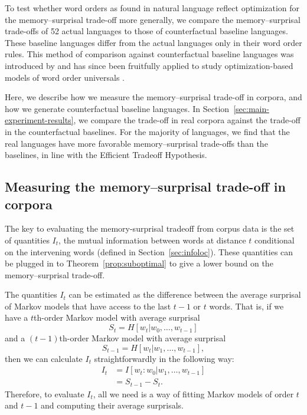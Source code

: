 To test whether word orders as found in natural language reflect optimization for the memory--surprisal trade-off more generally, we compare the memory--surprisal trade-offs of 52 actual languages to those of counterfactual baseline languages. These baseline languages differ from the actual languages only in their word order rules. This method of comparison against counterfactual baseline languages was introduced by \citet{gildea-optimizing-2007,gildea-grammars-2010} and has since been fruitfully applied to study optimization-based models of word order universals  \citep{futrell-large-scale-2015,gildea-human-2015,hahn2020universals}.

Here, we describe how we measure the memory--surprisal trade-off in corpora, and how we generate counterfactual baseline languages. In Section~\ref{sec:main-experiment-results}, we compare the trade-off in real corpora against the trade-off in the counterfactual baselines. For the majority of languages, we find that the real languages have more favorable memory--surprisal trade-offs than the baselines, in line with the Efficient Tradeoff Hypothesis.

\subsection{Measuring the memory--surprisal trade-off in corpora}

The key to evaluating the memory-surprisal tradeoff from corpus data is the set of quantities $I_t$, the  mutual information between words at distance $t$ conditional on the intervening words (defined in Section~\ref{sec:infoloc}). 
These quantities can be plugged in to Theorem~\ref{prop:suboptimal} to give a lower bound on the memory--surprisal trade-off.

The quantities $I_t$ can be estimated as the difference between the average surprisal of Markov models that have access to the last $t-1$ or $t$ words.
That is, if we have a $t$th-order Markov model with average surprisal
\begin{equation*}
    S_t = H[w_t | w_0, \dots, w_{t-1}]
\end{equation*}
and a $(t-1)$th-order Markov model with average surprisal
\begin{equation*}
    S_{t-1} = H[w_t | w_1, \dots, w_{t-1}],
\end{equation*}
then we can calculate $I_t$ straightforwardly in the following way:
\begin{align}
    \nonumber
    I_t &= I[w_t : w_0 | w_1, \dots, w_{t-1}] \\
    \nonumber
    &= S_{t-1} - S_t.
\end{align}
Therefore, to evaluate $I_t$, all we need is a way of fitting Markov models of order $t$ and $t-1$ and computing their average surprisals.

